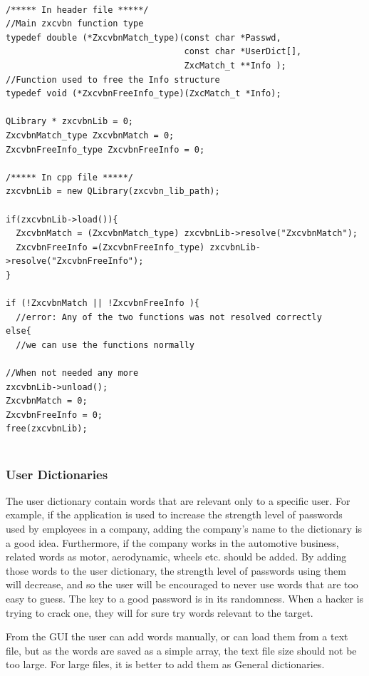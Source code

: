 \begin{lstlisting}[style=customc, float=htb, caption={Qlibrary basic usage}, label = {lis:qlibrary}]

/***** In header file *****/
//Main zxcvbn function type
typedef double (*ZxcvbnMatch_type)(const char *Passwd, 
                                   const char *UserDict[], 
                                   ZxcMatch_t **Info );
//Function used to free the Info structure
typedef void (*ZxcvbnFreeInfo_type)(ZxcMatch_t *Info);

QLibrary * zxcvbnLib = 0;
ZxcvbnMatch_type ZxcvbnMatch = 0;
ZxcvbnFreeInfo_type ZxcvbnFreeInfo = 0;

/***** In cpp file *****/     
zxcvbnLib = new QLibrary(zxcvbn_lib_path);
    
if(zxcvbnLib->load()){
  ZxcvbnMatch = (ZxcvbnMatch_type) zxcvbnLib->resolve("ZxcvbnMatch");
  ZxcvbnFreeInfo =(ZxcvbnFreeInfo_type) zxcvbnLib->resolve("ZxcvbnFreeInfo");
}

if (!ZxcvbnMatch || !ZxcvbnFreeInfo ){
  //error: Any of the two functions was not resolved correctly
else{
  //we can use the functions normally
  
//When not needed any more
zxcvbnLib->unload();
ZxcvbnMatch = 0;
ZxcvbnFreeInfo = 0;
free(zxcvbnLib);  
  
\end{lstlisting}


\subsubsection*{User Dictionaries}

The user dictionary contain words that are relevant only to a specific user. For example, if the application is used to increase the strength level of passwords used by employees in a company, adding the company's name to the dictionary is a good idea. Furthermore, if the company works in the automotive business, related words as motor, aerodynamic, wheels etc. should be added. By adding those words to the user dictionary, the strength level of passwords using them will decrease, and so the user will be encouraged to never use words that are too easy to guess. The key to a good password is in its randomness. When a hacker is trying to crack one, they will for sure try words relevant to the target.

From the GUI the user can add words manually, or can load them from a text file, but as the words are saved as a simple array, the text file size should not be too large. For large files, it is better to add them as General dictionaries.

